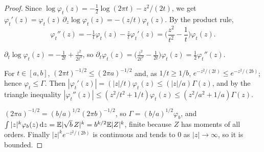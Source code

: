\documentclass{saim-blog}
\begin{document}
\begin{proof}
Since $\log\varphi_t(z)=-\tfrac12\log(2\pi t)-z^2/(2t)$, we get $\varphi_t'(z)=\varphi_t(z)\,\partial_z\log\varphi_t(z)=-(z/t)\varphi_t(z)$. By the product rule,
\[
\varphi_t''(z)=-\tfrac1t\varphi_t(z)-\tfrac zt\varphi_t'(z)=\Big(\frac{z^2}{t^2}-\frac1t\Big)\varphi_t(z).
\]

$\partial_t\log\varphi_t(z)=-\tfrac1{2t}+\tfrac{z^2}{2t^2}$, so $\partial_t\varphi_t(z)=\big(\tfrac{z^2}{2t^2}-\tfrac1{2t}\big)\varphi_t(z)=\tfrac12\varphi_t''(z)$.

For $t\in[a,b]$, $(2\pi t)^{-1/2}\le(2\pi a)^{-1/2}$ and, as $1/t\ge1/b$, $e^{-z^2/(2t)}\le e^{-z^2/(2b)}$; hence $\varphi_t\le\Gamma$. Then $|\varphi_t'(z)|=(|z|/t)\varphi_t(z)\le(|z|/a)\Gamma(z)$, and by the triangle inequality $|\varphi_t''(z)|\le(z^2/t^2+1/t)\varphi_t(z)\le(z^2/a^2+1/a)\Gamma(z)$.

$(2\pi a)^{-1/2}=(b/a)^{1/2}(2\pi b)^{-1/2}$, so $\Gamma=(b/a)^{1/2}\varphi_b$, and $\int|z|^k\varphi_b(z)\mathop{}\!\mathrm{d} z=\mathbb{E}|\sqrt b\,Z|^k=b^{k/2}\mathbb{E}|Z|^k$, finite because $Z$ has moments of all orders. Finally $|z|^ke^{-z^2/(2b)}$ is continuous and tends to $0$ as $|z|\to\infty$, so it is bounded.
\end{proof}
\end{document}
